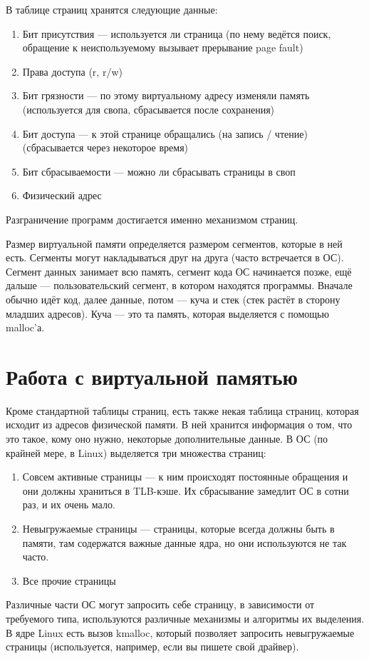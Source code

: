 \documentclass[main]{subfiles}
\begin{document}
В таблице страниц хранятся следующие данные:
\begin{enumerate}
\item Бит присутствия --- используется ли страница (по нему ведётся поиск,
обращение к неиспользуемому вызывает прерывание page fault)
\item Права доступа (r, r/w)
\item Бит грязности --- по этому виртуальному адресу изменяли память
(используется для свопа, сбрасывается после сохранения)
\item Бит доступа --- к этой странице обращались (на запись / чтение)
(сбрасывается через некоторое время)
\item Бит сбрасываемости --- можно ли сбрасывать страницы в своп
\item Физический адрес
\end{enumerate}

Разграничение программ достигается именно механизмом страниц.

Размер виртуальной памяти определяется размером сегментов, которые в ней есть.
Сегменты могут накладываться друг на друга (часто встречается в ОС). Сегмент
данных занимает всю память, сегмент кода ОС начинается позже, ещё дальше ---
пользовательский сегмент, в котором находятся программы.
Вначале обычно идёт код, далее данные, потом --- куча и стек (стек
растёт в сторону младших адресов). Куча --- это та память, которая выделяется
с помощью malloc'а.

\section{Работа с виртуальной памятью}
Кроме стандартной таблицы страниц, есть также некая таблица страниц, которая
исходит из адресов физической памяти. В ней хранится информация о том,
что это такое, кому оно нужно, некоторые дополнительные данные.
В ОС (по крайней мере, в Linux) выделяется три множества страниц:
\begin{enumerate}
\item Совсем активные страницы --- к ним происходят постоянные обращения
и они должны храниться в TLB-кэше. Их сбрасывание замедлит ОС в сотни раз, и
их очень мало.
\item Невыгружаемые страницы --- страницы, которые всегда должны быть в памяти,
там содержатся важные данные ядра, но они используются не так часто.
\item Все прочие страницы
\end{enumerate}
Различные части ОС могут запросить себе страницу, в зависимости от требуемого
типа, используются различные механизмы и алгоритмы их выделения. В ядре
Linux есть вызов kmalloc, который позволяет запросить невыгружаемые страницы
(используется, например, если вы пишете свой драйвер).
\end{document}
